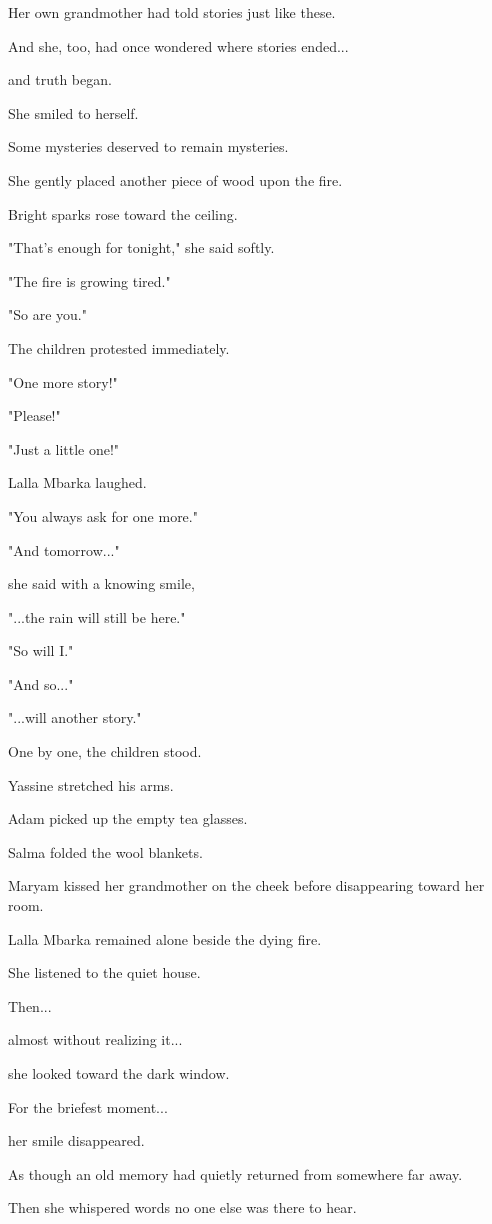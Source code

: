 \documentclass[12pt,openany]{book}
\begin{document}
Her own grandmother had told stories just like these.

And she, too, had once wondered where stories ended...

and truth began.

She smiled to herself.

Some mysteries deserved to remain mysteries.

She gently placed another piece of wood upon the fire.

Bright sparks rose toward the ceiling.

"That's enough for tonight," she said softly.

"The fire is growing tired."

"So are you."

The children protested immediately.

"One more story!"

"Please!"

"Just a little one!"

Lalla Mbarka laughed.

"You always ask for one more."

"And tomorrow..."

she said with a knowing smile,

"...the rain will still be here."

"So will I."

"And so..."

"...will another story."

One by one, the children stood.

Yassine stretched his arms.

Adam picked up the empty tea glasses.

Salma folded the wool blankets.

Maryam kissed her grandmother on the cheek before disappearing toward her room.

Lalla Mbarka remained alone beside the dying fire.

She listened to the quiet house.

Then...

almost without realizing it...

she looked toward the dark window.

For the briefest moment...

her smile disappeared.

As though an old memory had quietly returned from somewhere far away.

Then she whispered words no one else was there to hear.
\end{document}
